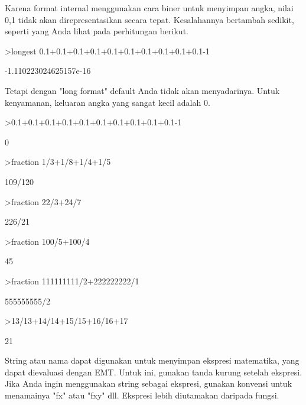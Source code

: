 \documentclass[a4paper,10pt]{article}
\begin{document}
\begin{eulernotebook}
\begin{eulercomment}
\begin{eulercomment}
\begin{eulercomment}
\begin{eulercomment}
\begin{eulercomment}
Karena format internal menggunakan cara biner untuk menyimpan angka,
nilai 0,1 tidak akan direpresentasikan secara tepat. Kesalahannya
bertambah sedikit, seperti yang Anda lihat pada perhitungan berikut.
\end{eulercomment}
\begin{eulerprompt}
>longest 0.1+0.1+0.1+0.1+0.1+0.1+0.1+0.1+0.1+0.1-1
\end{eulerprompt}
\begin{euleroutput}
   -1.110223024625157e-16 
\end{euleroutput}
\begin{eulercomment}
Tetapi dengan "long format" default Anda tidak akan menyadarinya.
Untuk kenyamanan, keluaran angka yang sangat kecil adalah 0.
\end{eulercomment}
\begin{eulerprompt}
>0.1+0.1+0.1+0.1+0.1+0.1+0.1+0.1+0.1+0.1-1
\end{eulerprompt}
\begin{euleroutput}
  0
\end{euleroutput}
\begin{eulerprompt}
>fraction 1/3+1/8+1/4+1/5
\end{eulerprompt}
\begin{euleroutput}
  109/120
\end{euleroutput}
\begin{eulerprompt}
>fraction 22/3+24/7
\end{eulerprompt}
\begin{euleroutput}
  226/21
\end{euleroutput}
\begin{eulerprompt}
>fraction 100/5+100/4
\end{eulerprompt}
\begin{euleroutput}
  45
\end{euleroutput}
\begin{eulerprompt}
>fraction 111111111/2+222222222/1
\end{eulerprompt}
\begin{euleroutput}
  555555555/2
\end{euleroutput}
\begin{eulerprompt}
>13/13+14/14+15/15+16/16+17
\end{eulerprompt}
\begin{euleroutput}
  21
\end{euleroutput}
\begin{eulercomment}
String atau nama dapat digunakan untuk menyimpan ekspresi matematika,
yang dapat dievaluasi dengan EMT. Untuk ini, gunakan tanda kurung
setelah ekspresi. Jika Anda ingin menggunakan string sebagai ekspresi,
gunakan konvensi untuk menamainya "fx" atau "fxy" dll. Ekspresi lebih
diutamakan daripada fungsi.


\end{eulercomment}
\end{eulercomment}
\end{eulercomment}
\end{eulercomment}
\end{eulercomment}
\end{eulernotebook}
\end{document}
